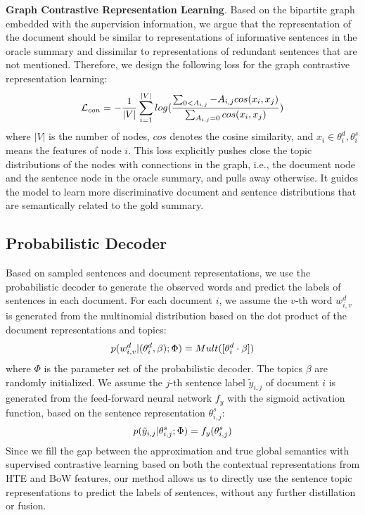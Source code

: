 \documentclass[11pt]{article}
\begin{document}
\textbf{Graph Contrastive Representation Learning}. Based on the bipartite graph embedded with the supervision information,
we argue that the representation of the document should be similar to representations of informative sentences in the oracle summary and dissimilar to representations of redundant sentences that are not mentioned.
Therefore, we design the following loss for the graph contrastive representation learning:
\begin{equation}
\small
\mathcal{L}_{con} = -\frac{1}{|V|}\sum_{i=1}^{|V|}log(\frac{\sum_{0<A_{i,j}}-A_{i,j}cos(x_i,x_j)}{\sum_{A_{i,j}=0}cos(x_i,x_j)})
\label{eq:g}
\end{equation}
where $|V|$ is the number of nodes, $cos$ denotes the cosine similarity, and $x_{i} \in {\theta^d_i, \theta^s_i}$ means the features of node $i$.
This loss explicitly pushes close the topic distributions of the nodes with connections in the graph, i.e., the document node and the sentence node in the oracle summary, and pulls away otherwise. 
It guides the model to learn more discriminative document and sentence distributions that are semantically related to the gold summary.


\subsection{Probabilistic Decoder}
Based on sampled sentences and document representations, we use the probabilistic decoder to generate the observed words and predict the labels of sentences in each document. 
For each document $i$, we assume the $v$-th word $w^d_{i,v}$ is generated from the multinomial distribution based on the dot product of the document representations and topics:
\begin{equation}
\small
p(w^d_{i,v}|(\theta^{d}_i,\beta);\Phi) = Mult([\theta^{d}_i\cdot\beta])
\label{eq:6}
\end{equation}
where $\Phi$ is the parameter set of the probabilistic decoder. The topics $\beta$ are randomly initialized. We assume the $j$-th sentence label $\tilde{y}_{i,j}$ of document $i$ is generated from the feed-forward neural network $f_y$ with the sigmoid activation function, based on the sentence representation $\theta^s_{i,j}$:
\begin{equation}
\small
p(\tilde{y}_{i,j}|\theta_{i,j}^s;\Phi) = f_y(\theta_{i,j}^s)
\label{eq:7}
\end{equation}
Since we fill the gap between the approximation and true global semantics with supervised contrastive learning based on both the contextual representations from HTE and BoW features,
our method allows us to directly use the sentence topic representations to predict the labels of sentences, without any further distillation or fusion.
\end{document}
